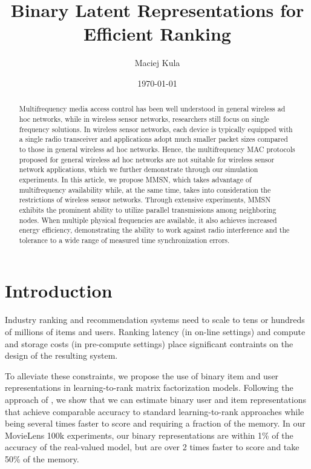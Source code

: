 \documentclass[sigconf]{acmart}
\begin{document}
\title{Binary Latent Representations for Efficient Ranking}
\author{Maciej Kula}
\date{\today}



\begin{abstract}
Multifrequency media access control has been well understood in
general wireless ad hoc networks, while in wireless sensor networks,
researchers still focus on single frequency solutions. In wireless
sensor networks, each device is typically equipped with a single
radio transceiver and applications adopt much smaller packet sizes
compared to those in general wireless ad hoc networks. Hence, the
multifrequency MAC protocols proposed for general wireless ad hoc
networks are not suitable for wireless sensor network applications,
which we further demonstrate through our simulation experiments. In
this article, we propose MMSN, which takes advantage of
multifrequency availability while, at the same time, takes into
consideration the restrictions of wireless sensor networks. Through
extensive experiments, MMSN exhibits the prominent ability to utilize
parallel transmissions among neighboring nodes. When multiple physical
frequencies are available, it also achieves increased energy
efficiency, demonstrating the ability to work against radio
interference and the tolerance to a wide range of measured time
synchronization errors.
\end{abstract}

\maketitle

\section{Introduction}

Industry ranking and recommendation systems need to scale to tens or hundreds of millions of items and users. Ranking latency (in on-line settings) and compute and storage costs (in pre-compute settings) place significant contraints on the design of the resulting system.

To alleviate these constraints, we propose the use of binary item and user representations in learning-to-rank matrix factorization models. Following the approach of \citet{rastegari2016xnor}, we show that we can estimate binary user and item representations that achieve comparable accuracy to standard learning-to-rank approaches while being several times faster to score and requiring a fraction of the memory. In our MovieLens 100k experiments, our binary representations are within 1\% of the accuracy of the real-valued model, but are over 2 times faster to score and take 50\% of the memory.
\end{document}
